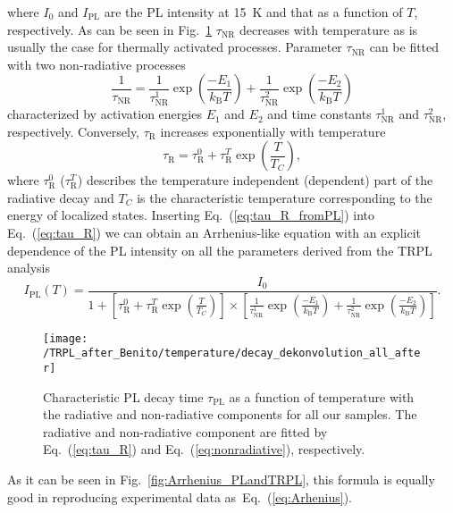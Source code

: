 \noindent where $I_0$ and $I_\mathrm{PL}$ are the PL intensity at 15~K and that as a function of $T$, respectively. As can be seen in Fig.~\ref{fig:TRPL_temp_decon} $\tau_\mathrm{NR}$ decreases with temperature as is usually the case for thermally activated processes. Parameter $\tau_\mathrm{NR}$ can be fitted with two non-radiative processes 
%
\begin{equation}
\frac{1}{\tau_\mathrm{NR}}=\frac{1}{\tau_\mathrm{NR}^1}\exp{\left(\frac{-E_1}{k_\mathrm{B}T}\right)} + \frac{1}{\tau_\mathrm{NR}^2}\exp{\left(\frac{-E_2}{k_\mathrm{B}T}\right)} \label{eq:nonradiative}
\end{equation}
characterized by activation energies $E_1$ and $E_2$ and time constants $\tau_\mathrm{NR}^1$ and $\tau_\mathrm{NR}^2$, respectively.
Conversely, $\tau_\mathrm{R}$ increases exponentially with temperature
%
\begin{equation}
\tau_\mathrm{R} = \tau_\mathrm{R}^0 + \tau_\mathrm{R}^T \exp{\left(\frac{T}{T_C}\right)}, \label{eq:tau_R} 
\end{equation}
where $ \tau_\mathrm{R}^0$ ($ \tau_\mathrm{R}^T$) describes the temperature independent (dependent) part of the radiative decay and $T_C$ is the characteristic temperature corresponding to the energy of localized states. Inserting Eq.~(\ref{eq:tau_R_fromPL}) into Eq.~(\ref{eq:tau_R}) we can obtain an Arrhenius-like equation with an explicit dependence of the PL intensity on all the parameters derived from the TRPL analysis
%
\begin{equation}
I_\mathrm{PL}(T)=\frac{I_0}{1+\left[\tau_\mathrm{R}^0+\tau_\mathrm{R}^T\exp{\left(\frac{T}{T_C}\right)}\right] \times \left[\frac{1}{\tau_\mathrm{NR}^1}\exp{\left(\frac{-E_1}{k_\mathrm{B}T}\right)} + \frac{1}{\tau_\mathrm{NR}^2}\exp{\left(\frac{-E_2}{k_\mathrm{B}T}\right)}\right]}. \label{eq:TRPL_Arhenius}
\end{equation}
%
\begin{figure}
	\centering
	\texttt{[image: /TRPL\_after\_Benito/temperature/decay\_dekonvolution\_all\_after]}
	\caption{Characteristic PL decay time $\tau_\mathrm{PL}$ as a function of temperature with the radiative and non-radiative components for all our samples. The radiative and non-radiative component are fitted by Eq.~(\ref{eq:tau_R}) and Eq.~(\ref{eq:nonradiative}), respectively.}
	\label{fig:TRPL_temp_decon}
\end{figure}

As it can be seen in Fig.~\ref{fig:Arrhenius_PLandTRPL}, this formula is equally good in reproducing experimental data as~Eq.~(\ref{eq:Arhenius}). 


